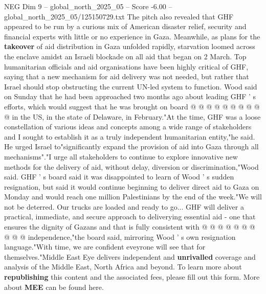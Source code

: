 \begin{textsample}{NEG Dim 9 – global\_north\_2025\_05 – Score -6.00 – global\_north\_2025\_05/125150729.txt}
The pitch also revealed that GHF appeared to be run by a curious mix of American disaster relief, security and financial experts with little or no experience in Gaza.
Meanwhile, as plans for the \textbf{takeover} of aid distribution in Gaza unfolded rapidly, starvation loomed across the enclave amidst an Israeli blockade on all aid that began on 2 March.
Top humanitarian officials and aid organisations have been highly critical of GHF, saying that a new mechanism for aid delivery was not needed, but rather that Israel should stop obstructing the current UN-led system to function.
Wood said on Sunday that he had been approached two months ago about leading GHF ' s efforts, which would suggest that he was brought on board @ @ @ @ @ @ @ @ @ @ in the US, in the state of Delaware, in February."At the time, GHF was a loose constellation of various ideas and concepts among a wide range of stakeholders and I sought to establish it as a truly independent humanitarian entity,"he said.
He urged Israel to"significantly expand the provision of aid into Gaza through all mechanisms"."I urge all stakeholders to continue to explore innovative new methods for the delivery of aid, without delay, diversion or discrimination,"Wood said.
GHF ' s board said it was disappointed to learn of Wood ' s sudden resignation, but said it would continue beginning to deliver direct aid to Gaza on Monday and would reach one million Palestinians by the end of the week."We will not be deterred.
Our trucks are loaded and ready to go...
GHF will deliver a practical, immediate, and secure approach to deliverying essential aid - one that ensures the dignity of Gazans and that is fully consistent with @ @ @ @ @ @ @ @ @ @ independence,"the board said, mirroring Wood ' s own resignation language."With time, we are confident eveyrone will see that for themselves."Middle East Eye delivers independent and \textbf{unrivalled} coverage and analysis of the Middle East, North Africa and beyond.
To learn more about \textbf{republishing} this content and the associated fees, please fill out this form.
More about \textbf{MEE} can be found here.

\end{textsample}
